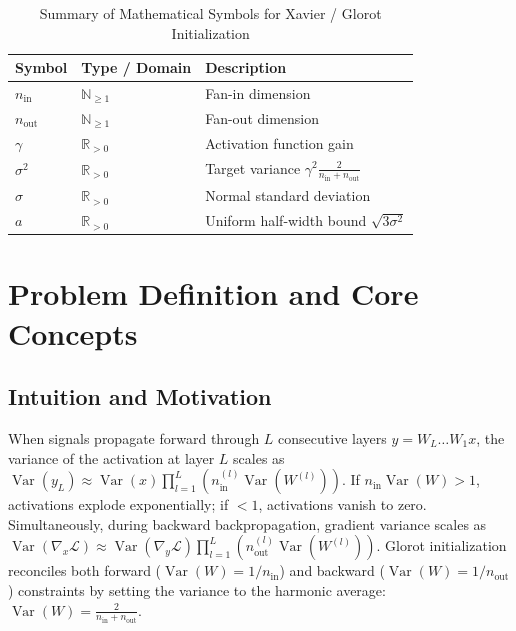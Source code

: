 \documentclass[11pt,a4paper]{article}
\theoremstyle{definition}
\begin{document}
\begin{table}[h]
\centering
\caption{Summary of Mathematical Symbols for Xavier / Glorot Initialization}
\begin{tabular}{lll}
\toprule
\textbf{Symbol} & \textbf{Type / Domain} & \textbf{Description} \\
\midrule
$n_{\text{in}}$ & $\mathbb{N}_{\ge 1}$ & Fan-in dimension \\
$n_{\text{out}}$ & $\mathbb{N}_{\ge 1}$ & Fan-out dimension \\
$\gamma$ & $\mathbb{R}_{> 0}$ & Activation function gain \\
$\sigma^2$ & $\mathbb{R}_{> 0}$ & Target variance $\gamma^2 \frac{2}{n_{\text{in}} + n_{\text{out}}}$ \\
$\sigma$ & $\mathbb{R}_{> 0}$ & Normal standard deviation \\
$a$ & $\mathbb{R}_{> 0}$ & Uniform half-width bound $\sqrt{3 \sigma^2}$ \\
\bottomrule
\end{tabular}
\end{table}

\section{Problem Definition and Core Concepts}

\subsection{Intuition and Motivation}
When signals propagate forward through $L$ consecutive layers $y = W_L \dots W_1 x$, the variance of the activation at layer $L$ scales as $\operatorname{Var}(y_L) \approx \operatorname{Var}(x) \prod_{l=1}^L (n_{\text{in}}^{(l)} \operatorname{Var}(W^{(l)}))$. If $n_{\text{in}} \operatorname{Var}(W) > 1$, activations explode exponentially; if $< 1$, activations vanish to zero. Simultaneously, during backward backpropagation, gradient variance scales as $\operatorname{Var}(\nabla_x \mathcal{L}) \approx \operatorname{Var}(\nabla_y \mathcal{L}) \prod_{l=1}^L (n_{\text{out}}^{(l)} \operatorname{Var}(W^{(l)}))$. Glorot initialization reconciles both forward ($\operatorname{Var}(W) = 1/n_{\text{in}}$) and backward ($\operatorname{Var}(W) = 1/n_{\text{out}}$) constraints by setting the variance to the harmonic average: $\operatorname{Var}(W) = \frac{2}{n_{\text{in}} + n_{\text{out}}}$.
\end{document}
